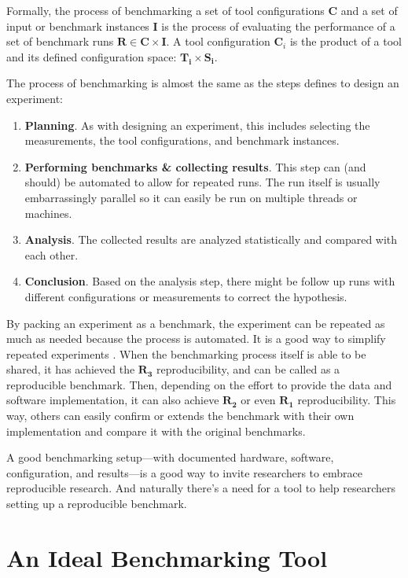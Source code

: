 Formally, the process of benchmarking a set of tool configurations $\bm{C}$ and a set of input or benchmark instances $\bm{I}$ is the process of evaluating the performance of a set of benchmark runs $\bm{R} \in \bm{C} \times \bm{I}$. A tool configuration $\bm{C}_i$ is the product of a tool and its defined configuration space: $\bm{T_i} \times \bm{S_i}$.

The process of benchmarking is almost the same as the steps \citet{montgomeryDesignAnalysisExperiments2013} defines to design an experiment:
\begin{enumerate}[noitemsep]
	\item \textbf{Planning}. As with designing an experiment, this includes selecting the measurements, the tool configurations, and benchmark instances.
	\item \textbf{Performing benchmarks \& collecting results}. This step can (and should) be automated to allow for repeated runs. The run itself is usually embarrassingly parallel so it can easily be run on multiple threads or machines.
	\item \textbf{Analysis}. The collected results are analyzed statistically and compared with each other.
	\item \textbf{Conclusion}. Based on the analysis step, there might be follow up runs with different configurations or measurements to correct the hypothesis.
\end{enumerate}

By packing an experiment as a benchmark, the experiment can be repeated as much as needed because the process is automated.
It is a good way to simplify repeated experiments \citep{tichyShouldComputerScientists1998}.
When the benchmarking process itself is able to be shared, it has achieved the $\bm{R_3}$ reproducibility, and can be called as a reproducible benchmark.
Then, depending on the effort to provide the data and software implementation, it can also achieve $\bm{R_2}$ or even $\bm{R_1}$ reproducibility.
This way, others can easily confirm or extends the benchmark with their own implementation and compare it with the original benchmarks.

A good benchmarking setup---with documented hardware, software, configuration, and results---is a good way to invite researchers to embrace reproducible research. And naturally there's a need for a tool to help researchers setting up a reproducible benchmark.


\section{An Ideal Benchmarking Tool}
\label{sec:idealBenchmarkingTool}

